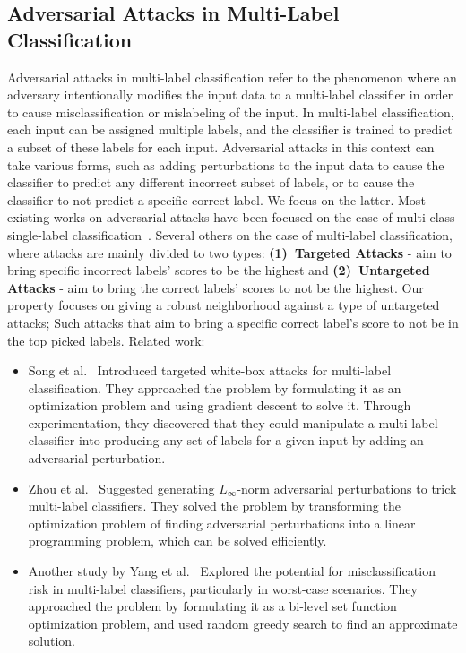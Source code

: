 \subsection{Adversarial Attacks in Multi-Label Classification}
Adversarial attacks in multi-label classification refer to the phenomenon where an adversary intentionally modifies the input data to a multi-label classifier in order to cause misclassification or mislabeling of the input.
In multi-label classification, each input can be assigned multiple labels, and the classifier is trained to predict a subset of these labels for each input.
Adversarial attacks in this context can take various forms, such as adding perturbations to the input data to cause the classifier to predict any different incorrect subset of labels, or to cause the classifier to not predict a specific correct label.
We focus on the latter.
Most existing works on adversarial attacks have been focused on the case of multi-class single-label classification~\cite{SINGLElABEL1, SINGLElABEL2, SINGLElABEL3, SINGLElABEL4}.
Several others on the case of multi-label classification, where attacks are mainly divided to two types: \textbf{(1)~Targeted Attacks} - aim to bring specific incorrect labels' scores to be the highest and \textbf{(2)~Untargeted Attacks} - aim to bring the correct labels' scores to not be the highest.
Our property focuses on giving a robust neighborhood against a type of untargeted attacks;
Such attacks that aim to bring a specific correct label's score to not be in the top picked labels.
Related work:
\begin{itemize}
    \item Song et al.~\cite{MULTIlABEL1} Introduced targeted white-box attacks for multi-label classification.
    They approached the problem by formulating it as an optimization problem and using gradient descent to solve it.
    Through experimentation, they discovered that they could manipulate a multi-label classifier into producing any set of labels for a given input by adding an adversarial perturbation.
    \item Zhou et al.~\cite{MULTIlABEL2} Suggested generating $L_{\infty}$-norm adversarial perturbations to trick multi-label classifiers.
    They solved the problem by transforming the optimization problem of finding adversarial perturbations into a linear programming problem, which can be solved efficiently.
    \item Another study by Yang et al.~\cite{MULTIlABEL3} Explored the potential for misclassification risk in multi-label classifiers, particularly in worst-case scenarios.
    They approached the problem by formulating it as a bi-level set function optimization problem, and used random greedy search to find an approximate solution.
\end{itemize}

